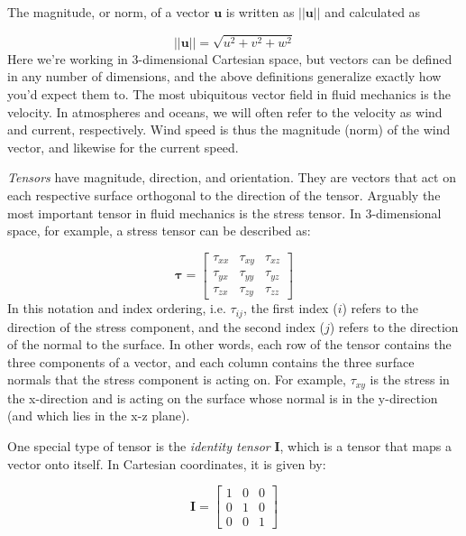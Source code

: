 \documentclass[12pt]{article}
\numberwithin{equation}{section}
\numberwithin{figure}{section}
\numberwithin{table}{section}
\begin{document}
The magnitude, or norm, of a vector 
$\mathbf{u}$ is written as $||\mathbf{u}||$ and calculated as

\begin{equation}
  ||\mathbf{u}|| = \sqrt{u^2 + v^2 + w^2}
\end{equation}
Here we're working in 3-dimensional Cartesian space, but vectors can be defined
in any number of dimensions, and the above definitions generalize exactly how
you'd expect them to.
The most ubiquitous vector field in fluid mechanics is the velocity.
In atmospheres and oceans, we will often refer to the velocity as wind and
current, respectively.
Wind speed is thus the magnitude (norm) of the wind vector, and likewise for
the current speed.

\textit{Tensors} have magnitude, direction, and orientation.
They are vectors that act on each respective surface orthogonal to the direction
of the tensor.
Arguably the most important tensor in fluid mechanics is the stress tensor.
In 3-dimensional space, for example, a stress tensor can be described as:

\begin{equation}
  \boldsymbol{\tau} =
  \begin{bmatrix}
    \tau_{xx} & \tau_{xy} & \tau_{xz} \\
    \tau_{yx} & \tau_{yy} & \tau_{yz} \\
    \tau_{zx} & \tau_{zy} & \tau_{zz}
  \end{bmatrix}
  \label{eq:stress_tensor}
\end{equation}
In this notation and index ordering, i.e. $\tau_{ij}$, the first index ($i$)
refers to the direction of the stress component, and the second index ($j$)
refers to the direction of the normal to the surface.
In other words, each row of the tensor contains the three components of a
vector, and each column contains the three surface normals that the stress
component is acting on.
For example, $\tau_{xy}$ is the stress in the x-direction and is acting on the
surface whose normal is in the y-direction (and which lies in the x-z plane).

One special type of tensor is the \textit{identity tensor}
$\mathbf{I}$, which is a tensor that maps a vector onto itself.
In Cartesian coordinates, it is given by:

\begin{equation}
  \mathbf{I} =
  \begin{bmatrix}
    1 & 0 & 0 \\
    0 & 1 & 0 \\
    0 & 0 & 1
  \end{bmatrix}
  \label{eq:identity_tensor}
\end{equation}
\end{document}

